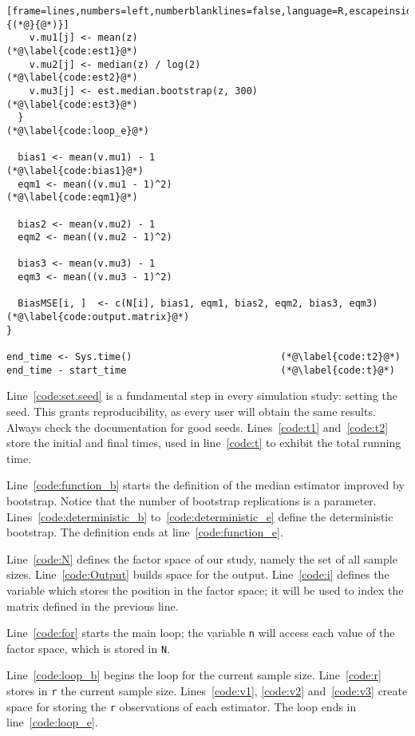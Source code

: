 \begin{lstlisting}[frame=lines,numbers=left,numberblanklines=false,language=R,escapeinside={(*@}{@*)}]
    v.mu1[j] <- mean(z)							(*@\label{code:est1}@*)
    v.mu2[j] <- median(z) / log(2)				(*@\label{code:est2}@*)
    v.mu3[j] <- est.median.bootstrap(z, 300)	(*@\label{code:est3}@*)
  }												(*@\label{code:loop_e}@*)
  
  bias1 <- mean(v.mu1) - 1						(*@\label{code:bias1}@*)
  eqm1 <- mean((v.mu1 - 1)^2)					(*@\label{code:eqm1}@*)
  
  bias2 <- mean(v.mu2) - 1
  eqm2 <- mean((v.mu2 - 1)^2)
  
  bias3 <- mean(v.mu3) - 1
  eqm3 <- mean((v.mu3 - 1)^2)
  
  BiasMSE[i, ]  <- c(N[i], bias1, eqm1, bias2, eqm2, bias3, eqm3)	(*@\label{code:output.matrix}@*)
}

end_time <- Sys.time()							(*@\label{code:t2}@*)
end_time - start_time							(*@\label{code:t}@*)
\end{lstlisting}

Line~\ref{code:set.seed} is a fundamental step in every simulation study: setting the seed.
This grants reproducibility, as every user will obtain the same results.
Always check the documentation for good seeds.
Lines~\ref{code:t1} and~\ref{code:t2} store the initial and final times, used in line~\ref{code:t} to exhibit the total running time.

Line~\ref{code:function_b} starts the definition of the median estimator improved by bootstrap.
Notice that the number of bootstrap replications is a parameter.
Lines~\ref{code:deterministic_b} to~\ref{code:deterministic_e} define the deterministic bootstrap.
The definition ends at line~\ref{code:function_e}.

Line~\ref{code:N} defines the factor space of our study, namely the set of all sample sizes.
Line~\ref{code:Output} builds space for the output.
Line~\ref{code:i} defines the variable which stores the position in the factor space; it will be used to index the matrix defined in the previous line.

Line~\ref{code:for} starts the main loop; the variable \verb|n| will access each value of the factor space, which is stored in \verb|N|.

Line~\ref{code:loop_b} begins the loop for the current sample size.
Line~\ref{code:r} stores in \verb|r| the current sample size.
Lines~\ref{code:v1}, \ref{code:v2} and~\ref{code:v3} create space for storing the \verb|r| observations of each estimator.
The loop ends in line~\ref{code:loop_e}.

